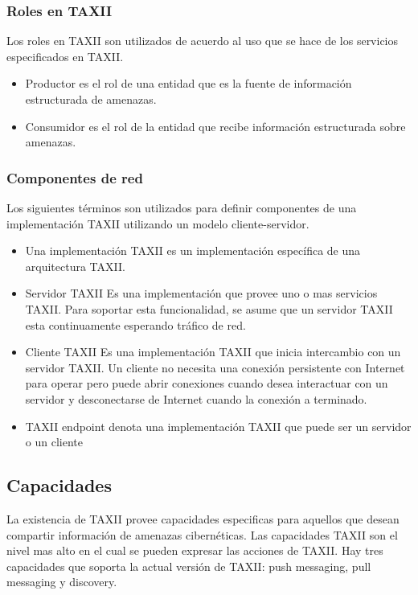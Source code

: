 \subsubsection{Roles en TAXII}

Los roles en TAXII son utilizados de acuerdo al uso que se hace de los servicios 
especificados en TAXII.
\begin{itemize}
  \item Productor es el rol de una entidad que es la fuente de información 
  estructurada de amenazas.
  \item Consumidor es el rol de la entidad que recibe información estructurada 
  sobre amenazas.
\end{itemize}

\subsubsection{Componentes de red}

Los siguientes términos son utilizados para definir componentes de una 
implementación TAXII utilizando un modelo cliente-servidor.
\begin{itemize}
  \item Una implementación TAXII es un implementación específica de una 
  arquitectura TAXII.
  \item Servidor TAXII Es una implementación que provee uno o mas servicios 
  TAXII. Para soportar esta funcionalidad, se asume que un servidor TAXII esta 
  continuamente esperando tráfico de red.
  \item Cliente TAXII Es una implementación TAXII que inicia intercambio con un 
  servidor TAXII. Un cliente no necesita una conexión persistente con Internet 
  para operar pero puede abrir conexiones cuando desea interactuar con un 
  servidor y desconectarse de Internet cuando la conexión a terminado.
  \item TAXII endpoint denota una implementación TAXII que puede ser un servidor 
  o un cliente
\end{itemize}


\subsection{Capacidades}
La existencia de TAXII provee capacidades especificas para aquellos que desean 
compartir información de amenazas cibernéticas. Las capacidades TAXII son el 
nivel mas alto en el cual se pueden expresar las acciones de TAXII. Hay tres 
capacidades que soporta la actual versión de TAXII: push messaging, pull 
messaging y discovery.

